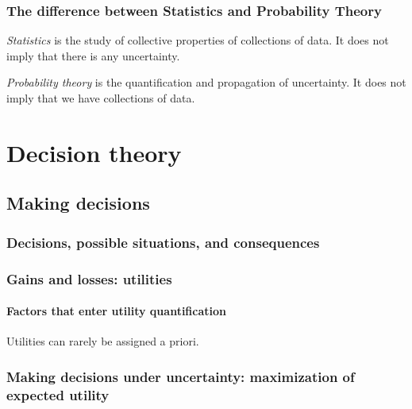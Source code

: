 \documentclass[
  a4paper,
  DIV=11,
  numbers=noendperiod,
  oneside]{scrreprt}
\begin{document}
\providecommand*{\mo}[1][=]{\mathord{\,#1\,}}
\providecommand*{\yX}{\se{X}}
\providecommand*{\yY}{\se{Y}}
\providecommand*{\yI}{\se{I}}

\hypertarget{the-difference-between-statistics-and-probability-theory}{%
\section{The difference between Statistics and Probability
Theory}\label{the-difference-between-statistics-and-probability-theory}}

\emph{Statistics} is the study of collective properties of collections
of data. It does not imply that there is any uncertainty.

\emph{Probability theory} is the quantification and propagation of
uncertainty. It does not imply that we have collections of data.

\part{Decision theory}

\hypertarget{making-decisions}{%
\chapter{Making decisions}\label{making-decisions}}

\hypertarget{decisions-possible-situations-and-consequences}{%
\section{Decisions, possible situations, and
consequences}\label{decisions-possible-situations-and-consequences}}

\hypertarget{gains-and-losses-utilities}{%
\section{Gains and losses: utilities}\label{gains-and-losses-utilities}}

\hypertarget{factors-that-enter-utility-quantification}{%
\subsection{Factors that enter utility
quantification}\label{factors-that-enter-utility-quantification}}

Utilities can rarely be assigned a priori.

\hypertarget{making-decisions-under-uncertainty-maximization-of-expected-utility}{%
\section{Making decisions under uncertainty: maximization of expected
utility}\label{making-decisions-under-uncertainty-maximization-of-expected-utility}}
\end{document}
